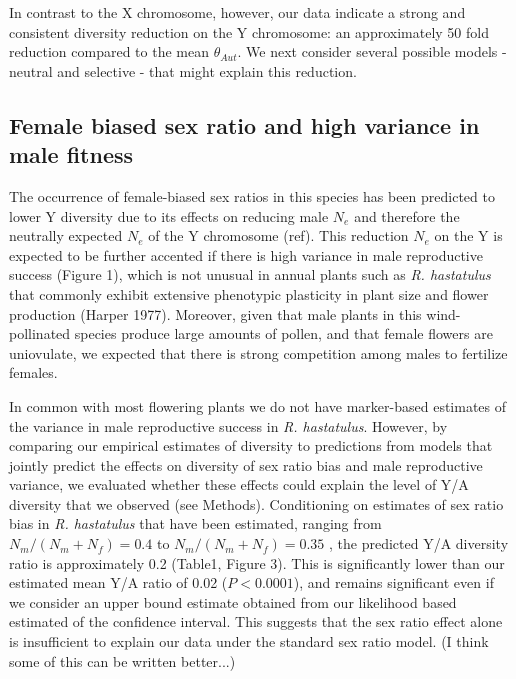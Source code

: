 \documentclass[9pt,twocolumn,twoside]{gsajnl}
\begin{document}
In contrast to the X chromosome, however, our data indicate a strong and consistent diversity reduction on the Y chromosome: an approximately 50 fold reduction compared to the mean $\theta_{Aut}$. We next consider several possible models - neutral and selective - that might explain this reduction.

\subsection*{Female biased sex ratio and high variance in male fitness}

 The occurrence of female-biased sex ratios in this species has been predicted to lower Y diversity due to its effects on reducing male $N_{e}$ and therefore the neutrally expected $N_{e}$ of the Y chromosome (\X ref). This reduction $N_{e}$ on the Y is expected to be further accented if there is high variance in male reproductive success (Figure 1), which is not unusual in annual plants such as \textit{R. hastatulus} that commonly exhibit extensive phenotypic plasticity in plant size and flower production (\X Harper 1977). Moreover, given that male plants in this wind-pollinated species produce large amounts of pollen, and that female flowers are uniovulate, we expected that there is strong competition among males to fertilize females.

 In common with most flowering plants we do not have marker-based estimates of the variance in male reproductive success in \textit{R. hastatulus}. However, by comparing our empirical estimates of diversity to predictions from models that jointly predict the effects on diversity of sex ratio bias and male reproductive variance, we evaluated whether these effects could explain the level of Y/A diversity that we observed (see Methods). Conditioning on estimates of sex ratio bias in \textit{R. hastatulus} that have been estimated, ranging from $N_{m}/(N_{m}+N_{f})=0.4$ to $N_{m}/(N_{m}+N_{f})=0.35$ \citep{pickup2013influence}, the predicted Y/A diversity ratio  is approximately 0.2 (Table1, Figure 3). This is significantly lower than our estimated mean Y/A ratio of 0.02 ($\textit{P}<0.0001$), and remains significant even if we consider an upper bound estimate obtained from our likelihood based estimated of the confidence interval. This suggests that the sex ratio effect alone is insufficient to explain our data under the standard sex ratio model. (\X I think some of this can be written better...)
\end{document}
